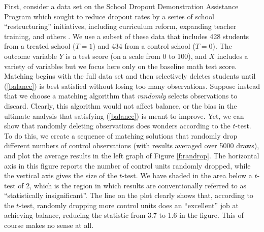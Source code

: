 \documentclass[11pt,titlepage]{article}
\begin{document}
First, consider a data set on the School Dropout Demonstration
Assistance Program which sought to reduce dropout rates by a series of
school ``restructuring'' initiatives, including curriculum reform,
expanding teacher training, and others \citep{AgoDyn04,Stuart04}.  We
use a subset of these data that includes 428 students from a treated
school ($T=1$) and 434 from a control school ($T=0$).  The outcome
variable $Y$ is a test score (on a scale from 0 to 100), and $X$ includes
a variety of variables but we focus here only on the baseline math
test score.  Matching begins with the full data set and then
selectively deletes students until (\ref{balance}) is best satisfied
without losing too many observations.  Suppose instead that we choose
a matching algorithm that \emph{randomly} selects observations to
discard.  Clearly, this algorithm would not affect balance, or the
bias in the ultimate analysis that satisfying (\ref{balance}) is meant
to improve.  Yet, we can show that randomly deleting observations does
wonders according to the $t$-test.  To do this, we create a sequence
of matching solutions that randomly drop different numbers of control
observations (with results averaged over 5000 draws), and plot the
average results in the left graph of Figure \ref{f:randrop}.  The
horizontal axis in this figure reports the number of control units
randomly dropped, while the vertical axis gives the size of the
$t$-test.  We have shaded in the area below a $t$-test of 2, which is
the region in which results are conventionally referred to as
``statistically insignificant''.  The line on the plot clearly shows
that, according to the $t$-test, randomly dropping more control units
does an ``excellent'' job at achieving balance, reducing the statistic
from 3.7 to 1.6 in the figure.  This of course makes no sense at all.
\end{document}
